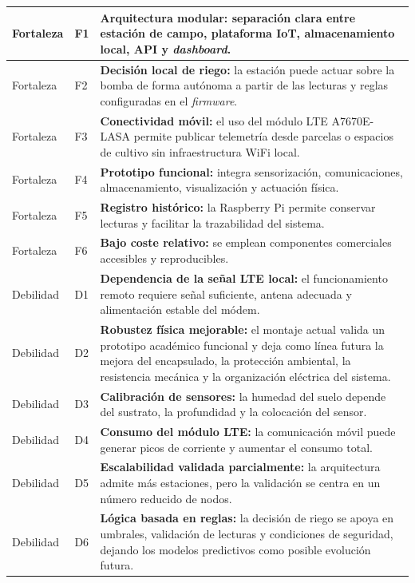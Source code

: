 \begin{longtable}{|
>{\raggedright\arraybackslash}p{}|
>{\raggedright\arraybackslash}p{}|
>{\raggedright\arraybackslash}p{}|}
Fortaleza & F1 & \textbf{Arquitectura modular:} separación clara entre estación de campo, plataforma IoT, almacenamiento local, API y \textit{dashboard}. \\
\hline
Fortaleza & F2 & \textbf{Decisión local de riego:} la estación puede actuar sobre la bomba de forma autónoma a partir de las lecturas y reglas configuradas en el \textit{firmware}. \\
\hline
Fortaleza & F3 & \textbf{Conectividad móvil:} el uso del módulo LTE A7670E-LASA permite publicar telemetría desde parcelas o espacios de cultivo sin infraestructura WiFi local. \\
\hline
Fortaleza & F4 & \textbf{Prototipo funcional:} integra sensorización, comunicaciones, almacenamiento, visualización y actuación física. \\
\hline
Fortaleza & F5 & \textbf{Registro histórico:} la Raspberry Pi permite conservar lecturas y facilitar la trazabilidad del sistema. \\
\hline
Fortaleza & F6 & \textbf{Bajo coste relativo:} se emplean componentes comerciales accesibles y reproducibles. \\
\hline
Debilidad & D1 & \textbf{Dependencia de la señal LTE local:} el funcionamiento remoto requiere señal suficiente, antena adecuada y alimentación estable del módem. \\
\hline
Debilidad & D2 & \textbf{Robustez física mejorable:} el montaje actual valida un prototipo académico funcional y deja como línea futura la mejora del encapsulado, la protección ambiental, la resistencia mecánica y la organización eléctrica del sistema. \\
\hline
Debilidad & D3 & \textbf{Calibración de sensores:} la humedad del suelo depende del sustrato, la profundidad y la colocación del sensor. \\
\hline
Debilidad & D4 & \textbf{Consumo del módulo LTE:} la comunicación móvil puede generar picos de corriente y aumentar el consumo total. \\
\hline
Debilidad & D5 & \textbf{Escalabilidad validada parcialmente:} la arquitectura admite más estaciones, pero la validación se centra en un número reducido de nodos. \\
\hline
Debilidad & D6 & \textbf{Lógica basada en reglas:} la decisión de riego se apoya en umbrales, validación de lecturas y condiciones de seguridad, dejando los modelos predictivos como posible evolución futura. \\
\hline

\end{longtable}

